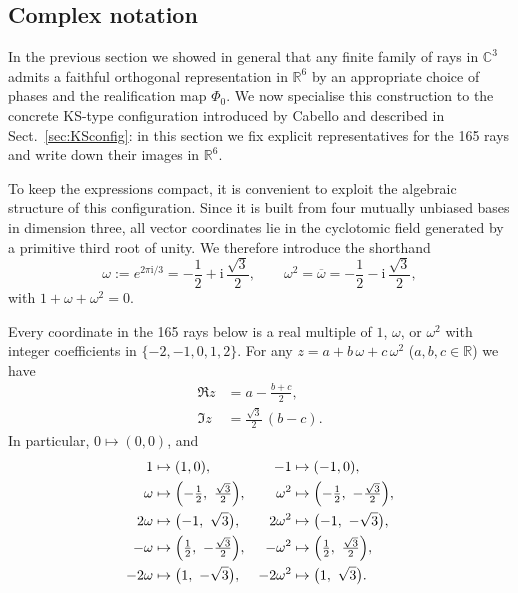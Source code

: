 \documentclass[%
  reprint,
  superscriptaddress,
  amsmath,amssymb,
  pra,
  floatfix,
  longbibliography
]{revtex4-2}
\begin{document}
\subsection{Complex notation}

In the previous section we showed in general that any finite family of rays in $\mathbb{C}^3$
admits a faithful orthogonal representation in $\mathbb{R}^6$ by an appropriate choice of
phases and the realification map $\Phi_0$. We now specialise this construction to the
concrete KS-type configuration introduced by Cabello and described in
Sect.~\ref{sec:KSconfig}: in this section we fix explicit representatives for the 165
rays and write down their images in $\mathbb{R}^6$.

To keep the expressions compact, it is convenient to exploit the algebraic structure of
this configuration. Since it is built from four mutually unbiased bases in dimension
three, all vector coordinates lie in the cyclotomic field generated by a primitive
third root of unity. We therefore introduce the shorthand
\begin{equation}
  \omega := e^{2\pi\mathrm{i}/3} = -\frac12 + \mathrm{i}\,\frac{\sqrt{3}}{2}, \qquad
  \omega^2 = \overline{\omega} = -\frac12 - \mathrm{i}\,\frac{\sqrt{3}}{2},
\end{equation}
with $1+\omega+\omega^2=0$.

Every coordinate in the 165 rays below is a real multiple of $1$, $\omega$, or $\omega^2$ with integer coefficients in $\{-2,-1,0,1,2\}$. For any $z=a+b\,\omega+c\,\omega^2$ ($a,b,c\in\mathbb{R}$) we have
\begin{align}
  \Re z &= a - \frac{b+c}{2},\\
  \Im z &= \frac{\sqrt{3}}{2}\,(b-c).
\end{align}
In particular, $0 \mapsto (0,0)$, and
\begin{align}
  1 &\mapsto (1,0), &
  -1 &\mapsto (-1,0), \nonumber\\
  \omega &\mapsto \Bigl(-\tfrac12,\ \tfrac{\sqrt{3}}{2}\Bigr), &
  \omega^2 &\mapsto \Bigl(-\tfrac12,\ -\tfrac{\sqrt{3}}{2}\Bigr), \nonumber\\
  2\omega &\mapsto \bigl(-1,\ \sqrt{3}\bigr), &
  2\omega^2 &\mapsto \bigl(-1,\ -\sqrt{3}\bigr), \nonumber\\
  -\omega &\mapsto \Bigl(\tfrac12,\ -\tfrac{\sqrt{3}}{2}\Bigr), &
  -\omega^2 &\mapsto \Bigl(\tfrac12,\ \tfrac{\sqrt{3}}{2}\Bigr), \\
  -2\omega &\mapsto \bigl(1,\ -\sqrt{3}\bigr), &
  -2\omega^2 &\mapsto \bigl(1,\ \sqrt{3}\bigr). \nonumber
\end{align}
\end{document}
